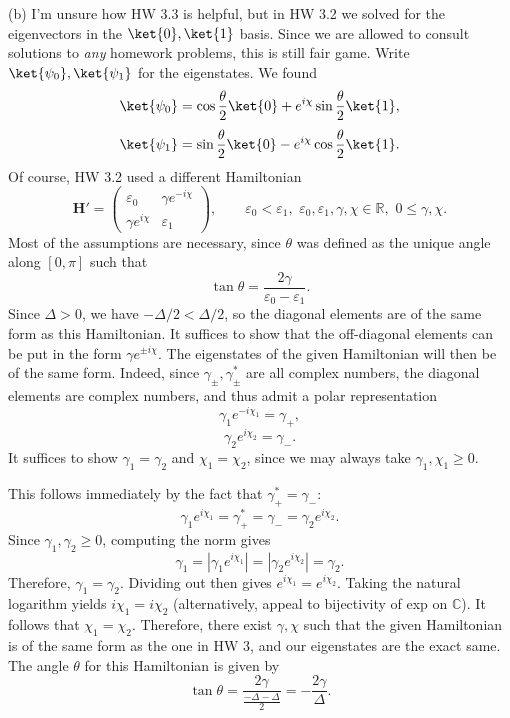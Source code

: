 \documentclass[11pt, letterpaper]{article}
\theoremstyle{plain}
\begin{document}
(b) I'm unsure how HW 3.3 is helpful, but in HW 3.2 we solved for the eigenvectors in the $\ket{0},\ket{1}$ basis. Since we are allowed to consult solutions to \emph{any} homework problems, this is still fair game. Write $\ket{\psi _0},\ket{\psi _1}$ for the eigenstates. We found
\[
	\ket{\psi _0} = \cos \frac{\theta }{2} \ket{0} + e^{i\chi }\sin \frac{\theta }{2}  \ket{1}
,\]
\[
	\ket{\psi _1} = \sin \frac{\theta }{2} \ket{0} - e^{i\chi } \cos \frac{\theta }{2} \ket{1}
.\]
Of course, HW 3.2 used a different Hamiltonian
\[
	\mathbf{H} ' = \begin{pmatrix}
	\varepsilon _0 & \gamma e^{-i\chi }  \\
	\gamma e^{i\chi }  & \varepsilon _1
	\end{pmatrix},\qquad \varepsilon _0<\varepsilon _1,\,\, \varepsilon _0,\varepsilon _1,\gamma,\chi  \in\mathbb{R} ,\,\, 0\leq \gamma ,\chi 
.\]
Most of the assumptions are necessary, since $\theta $ was defined as the unique angle along $[0,\pi ]$ such that
\[
	\tan \theta =\frac{2\gamma }{\varepsilon _0-\varepsilon _1} 
.\]
Since $\Delta >0$, we have $-\Delta/2 <\Delta/2 $, so the diagonal elements are of the same form as this Hamiltonian. It suffices to show that the off-diagonal elements can be put in the form $\gamma e^{\pm i\chi } $. The eigenstates of the given Hamiltonian will then be of the same form. Indeed, since $\gamma _\pm,\gamma _\pm^*$ are all complex numbers, the diagonal elements are complex numbers, and thus admit a polar representation
\[
	\gamma _1 e^{-i\chi _1} =\gamma _+,
\]
\[
	\gamma _2 e^{i\chi _2} =\gamma _-
.\]
It suffices to show $\gamma _1=\gamma _2$ and $\chi _1=\chi _2$, since we may always take $\gamma _1,\chi _1\geq 0$.

This follows immediately by the fact that $\gamma _+^*=\gamma _-$:
\[
	\gamma_1 e^{i\chi _1} =\gamma _+^* = \gamma _- = \gamma _2 e^{i\chi _2} 
.\]
Since $\gamma _1,\gamma _2 \geq 0$, computing the norm gives
\[
	\gamma _1=\left| \gamma _1 e^{i\chi _1}  \right|=\left| \gamma _2e^{i\chi _2}  \right| =\gamma _2
.\]
Therefore, $\gamma _1=\gamma _2$. Dividing out then gives $e^{i\chi _1} =e^{i\chi _2} $. Taking the natural logarithm yields $i\chi _1=i\chi _2$ (alternatively, appeal to bijectivity of exp on $\mathbb{C} $). It follows that $\chi _1=\chi _2$. Therefore, there exist $\gamma ,\chi $ such that the given Hamiltonian is of the same form as the one in HW 3, and our eigenstates are the exact same. The angle $\theta $ for this Hamiltonian is given by
\[
	\tan \theta =\frac{2\gamma }{\frac{-\Delta -\Delta }{2}} =-\frac{2\gamma }{\Delta } 
.\]
\end{document}
